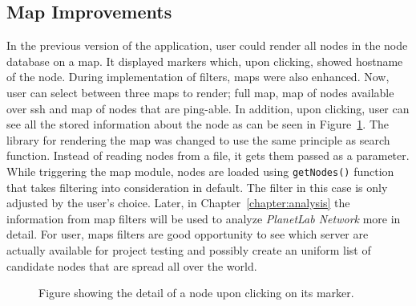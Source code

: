 {{{{{{\subsection{Map Improvements}
In the previous version of the application, user could render all nodes in the node database on a map. It displayed markers which, upon clicking, showed hostname of the node. During implementation of filters, maps were also enhanced. Now, user can select between three maps to render; full map, map of nodes available over ssh and map of nodes that are ping-able. In addition, upon clicking, user can see all the stored information about the node as can be seen in Figure~\ref{fig:mapnodedetail}. The library for rendering the map was changed to use the same principle as search function. Instead of reading nodes from a file, it gets them passed as a parameter. While triggering the map module, nodes are loaded using \texttt{getNodes()} function that takes filtering into consideration in default. The filter in this case is only adjusted by the user's choice. Later, in Chapter~\ref{chapter:analysis} the information from map filters will be used to analyze \textit{PlanetLab Network} more in detail. For user, maps filters are good opportunity to see which server are actually available for project testing and possibly create an uniform list of candidate nodes that are spread all over the world. 

\begin{figure}[H]
	\centering
	\caption{Figure showing the detail of a node upon clicking on its marker.}
	\label{fig:mapnodedetail}
\end{figure}

}}}}}}
